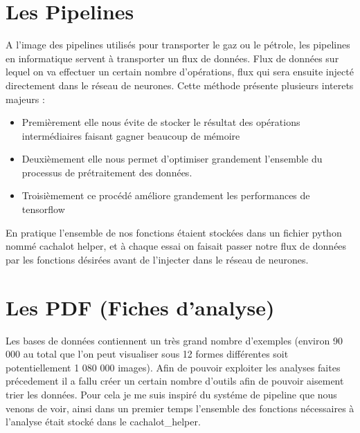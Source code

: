 \hypertarget{Les-Pipelines}{%
\section{Les Pipelines}
\label{Les-Pipelines}}

A l'image des pipelines utilisés pour transporter le gaz ou le pétrole, les pipelines en informatique servent à transporter un flux de données.
Flux de données sur lequel on va effectuer un certain nombre d'opérations, flux qui sera ensuite injecté directement dans le réseau de neurones.
Cette méthode présente plusieurs interets majeurs :
\begin{itemize}
\item Premièrement elle nous évite de stocker le résultat des opérations intermédiaires  faisant gagner beaucoup de mémoire
\item Deuxièmement elle nous permet d'optimiser grandement l'ensemble du processus de prétraitement des données.
\item Troisièmement ce procédé améliore grandement les performances de tensorflow
\end{itemize}

En pratique l'ensemble de nos fonctions étaient stockées dans un fichier python nommé cachalot helper, et à chaque essai on faisait passer notre flux de données par les fonctions désirées avant de l'injecter dans le réseau de neurones.


\hypertarget{Les-PDF}{%
\section{Les PDF (Fiches d'analyse)}
\label{Les-PDF}}

Les bases de données contiennent un très grand nombre d'exemples (environ 90 000 au total que l'on peut visualiser sous 12 formes différentes soit potentiellement 1 080 000 images).
Afin de pouvoir exploiter les analyses faites précedement il a fallu créer un certain nombre d'outils afin de pouvoir aisement trier les données.
Pour cela je me suis inspiré du systéme de pipeline que nous venons de voir, ainsi dans un premier temps l'ensemble des fonctions nécessaires à l'analyse était stocké dans le cachalot{\_}helper.


